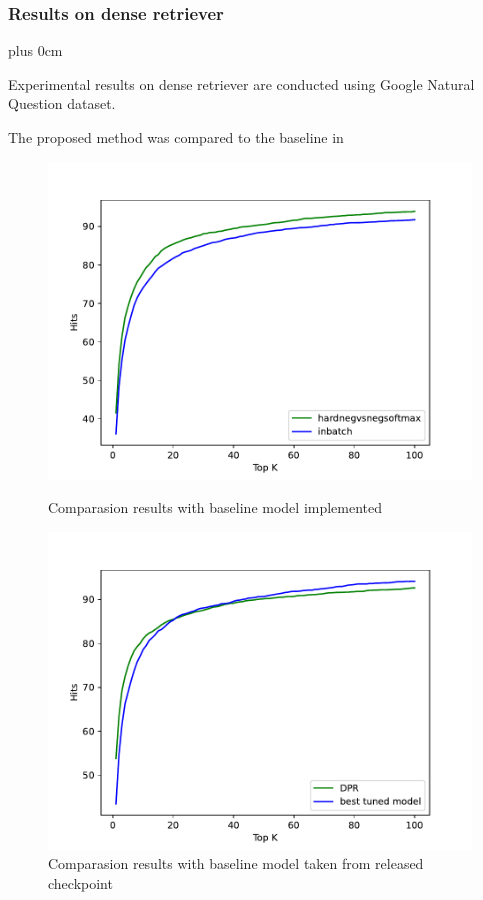 \documentclass[11pt]{beamer}
\renewcommand{\raggedright}{\leftskip=0pt \rightskip=0pt plus 0cm}
\let\olditemize=\itemize
\renewenvironment{itemize}{\olditemize\raggedright}{\endlist}
\begin{document}
\begin{frame}
\frametitle{Results on dense retriever}
\begin{adjustwidth}{-2em}{0em}
\begin{itemize}
	\item Experimental results on dense retriever are conducted using Google Natural Question dataset.
	\item The proposed method was compared to the baseline in \cite{dpr}
\end{itemize}
\begin{figure}
\begin{minipage}{.45\linewidth}
\includegraphics[scale=.32]{images/PDF/experiments/inbatch_hardnegvsnegsoftmax_4-1-5.pdf}
\caption{\fontsize{8pt}{\baselineskip}\selectfont Comparasion results with baseline model implemented}
\end{minipage}
\hfill
\begin{minipage}{.45\linewidth}
\raggedleft
\includegraphics[scale=.32]{images/PDF/experiments/benchmark_compare.pdf}
\caption{\fontsize{8pt}{\baselineskip}\selectfont Comparasion results with baseline model taken from released checkpoint}	
\end{minipage}
\end{figure}
\end{adjustwidth}
\end{frame}
\end{document}
